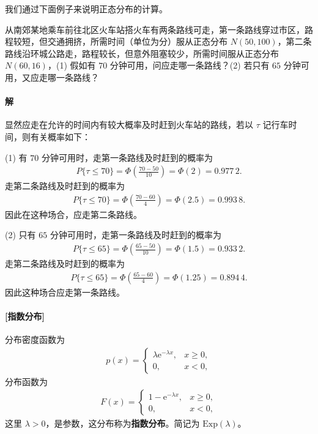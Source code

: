 \documentclass[../../main.tex]{subfiles}
\begin{document}
我们通过下面例子来说明正态分布的计算。

\begin{example}[赶火车路线选择]\label{example:ch03-赶火车}
从南郊某地乘车前往北区火车站搭火车有两条路线可走，第一条路线穿过市区，路程较短，但交通拥挤，所需时间（单位为分）服从正态分布 $N(50,100)$，第二条路线沿环城公路走，路程较长，但意外阻塞较少，所需时间服从正态分布 $N(60,16)$，(1) 假如有 $70$ 分钟可用，问应走哪一条路线？(2) 若只有 $65$ 分钟可用，又应走哪一条路线？

\paragraph*{解}显然应走在允许的时间内有较大概率及时赶到火车站的路线，若以 $\tau$ 记行车时间，则有关概率如下：

(1) 有 $70$ 分钟可用时，走第一条路线及时赶到的概率为
\begin{align*}P\{\tau\leqslant 70\}=\Phi\!\left(\frac{70-50}{10}\right)=\Phi(2)=0.977\,2.\end{align*}
走第二条路线及时赶到的概率为
\begin{align*}P\{\tau\leqslant 70\}=\Phi\!\left(\frac{70-60}{4}\right)=\Phi(2.5)=0.993\,8.\end{align*}
因此在这种场合，应走第二条路线。

(2) 只有 $65$ 分钟可用时，走第一条路线及时赶到的概率为
\begin{align*}P\{\tau\leqslant 65\}=\Phi\!\left(\frac{65-50}{10}\right)=\Phi(1.5)=0.933\,2.\end{align*}
走第二条路线及时赶到的概率为
\begin{align*}P\{\tau\leqslant 65\}=\Phi\!\left(\frac{65-60}{4}\right)=\Phi(1.25)=0.894\,4.\end{align*}
因此这种场合应走第一条路线。
\end{example}

\paragraph{[指数分布]}分布密度函数为
\begin{align}
p(x)=
\begin{cases}
\lambda\mathrm{e}^{-\lambda x}, & x\geqslant 0,\\
0, & x<0,
\end{cases}\label{align:ch03-指数密度}
\end{align}
分布函数为
\begin{align}
F(x)=
\begin{cases}
1-\mathrm{e}^{-\lambda x}, & x\geqslant 0,\\
0, & x<0,
\end{cases}\label{align:ch03-指数分布函数}
\end{align}
这里 $\lambda>0$，是参数，这分布称为\textbf{指数分布}。简记为 $\mathrm{Exp}(\lambda)$。
\end{document}
